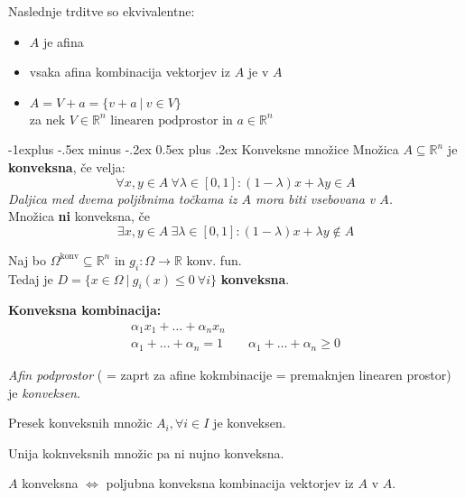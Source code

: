 \documentclass[a4paper,8pt]{extarticle}
\makeatletter
\renewcommand{\subsection}{\@startsection{subsection}{2}{0mm}%
                                {-1explus -.5ex minus -.2ex}%
                                {0.5ex plus .2ex}%
                                {\normalfont\normalsize\bfseries}}
\makeatother
\begin{document}
\begin{multicols}{4}
Naslednje trditve so ekvivalentne:
\begin{itemize}
	\item $A$ je afina
	\item vsaka afina kombinacija vektorjev iz $A$ je v $A$
	\item $A = V + a = \{ v + a\ |\ v \in V \}$\\ za nek $ V \in \mathbb{R}^n \text{ linearen podprostor}$ in $a \in \mathbb{R}^n$
\end{itemize}

\subsection{Konveksne množice}
Množica $A \subseteq \mathbb{R}^n $ je \textbf{konveksna}, če velja:
\[ \forall x,y \in A \ \forall \lambda \in [0,1] : (1-\lambda)x + \lambda y \in A \]
\emph{Daljica med dvema poljibnima točkama iz $A$ mora biti vsebovana v $A$.}\\

Množica \textbf{ni} konveksna, če
\[\exists x,y \in A \ \exists \lambda \in [0, 1]: (1-\lambda)x + \lambda y \notin A \]

Naj bo $\Omega^{\text{konv}} \subseteq \mathbb{R}^n$ in $g_i: \Omega \to \mathbb{R}$ konv. fun.\\
Tedaj je $D = \{ x \in \Omega\ |\ g_i(x) \leq 0\ \forall i\}$ \textbf{konveksna}.

\textbf{Konveksna kombinacija:}
\begin{gather*}
	\alpha_1 x_1 + \dots + \alpha_n x_n \\
	\alpha_1 + \dots + \alpha_n = 1 \qquad \alpha_1 + \dots + \alpha_n \geq 0 
\end{gather*}

\emph{Afin podprostor} ( = zaprt za afine kokmbinacije = premaknjen linearen prostor) je \emph{konveksen}.

Presek konveksnih množic $A_i, \forall i\in I$ je konveksen.

Unija koknveksnih množic pa ni nujno konveksna.

$A$ konveksna $\iff$ poljubna konveksna kombinacija vektorjev iz $A$ v $A$.


\end{multicols}
\end{document}
